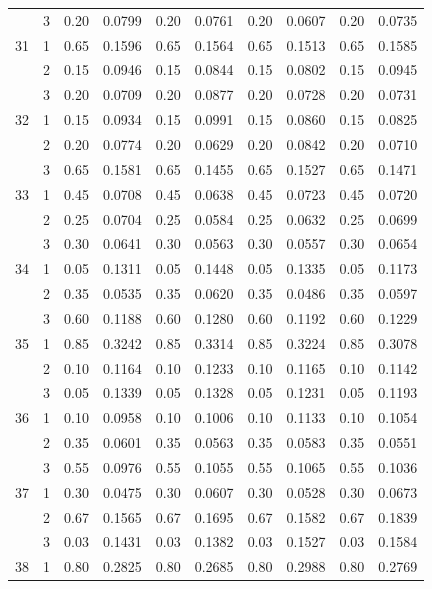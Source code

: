 \begin{longtable}{llcccccccc}
   & 3 & 0.20 & 0.0799 & 0.20 & 0.0761 & 0.20 & 0.0607 & 0.20 & 0.0735 \\ 
  31 & 1 & 0.65 & 0.1596 & 0.65 & 0.1564 & 0.65 & 0.1513 & 0.65 & 0.1585 \\ 
   & 2 & 0.15 & 0.0946 & 0.15 & 0.0844 & 0.15 & 0.0802 & 0.15 & 0.0945 \\ 
   & 3 & 0.20 & 0.0709 & 0.20 & 0.0877 & 0.20 & 0.0728 & 0.20 & 0.0731 \\ 
  32 & 1 & 0.15 & 0.0934 & 0.15 & 0.0991 & 0.15 & 0.0860 & 0.15 & 0.0825 \\ 
   & 2 & 0.20 & 0.0774 & 0.20 & 0.0629 & 0.20 & 0.0842 & 0.20 & 0.0710 \\ 
   & 3 & 0.65 & 0.1581 & 0.65 & 0.1455 & 0.65 & 0.1527 & 0.65 & 0.1471 \\ 
  33 & 1 & 0.45 & 0.0708 & 0.45 & 0.0638 & 0.45 & 0.0723 & 0.45 & 0.0720 \\ 
   & 2 & 0.25 & 0.0704 & 0.25 & 0.0584 & 0.25 & 0.0632 & 0.25 & 0.0699 \\ 
   & 3 & 0.30 & 0.0641 & 0.30 & 0.0563 & 0.30 & 0.0557 & 0.30 & 0.0654 \\ 
  34 & 1 & 0.05 & 0.1311 & 0.05 & 0.1448 & 0.05 & 0.1335 & 0.05 & 0.1173 \\ 
   & 2 & 0.35 & 0.0535 & 0.35 & 0.0620 & 0.35 & 0.0486 & 0.35 & 0.0597 \\ 
   & 3 & 0.60 & 0.1188 & 0.60 & 0.1280 & 0.60 & 0.1192 & 0.60 & 0.1229 \\ 
  35 & 1 & 0.85 & 0.3242 & 0.85 & 0.3314 & 0.85 & 0.3224 & 0.85 & 0.3078 \\ 
   & 2 & 0.10 & 0.1164 & 0.10 & 0.1233 & 0.10 & 0.1165 & 0.10 & 0.1142 \\ 
   & 3 & 0.05 & 0.1339 & 0.05 & 0.1328 & 0.05 & 0.1231 & 0.05 & 0.1193 \\ 
  36 & 1 & 0.10 & 0.0958 & 0.10 & 0.1006 & 0.10 & 0.1133 & 0.10 & 0.1054 \\ 
   & 2 & 0.35 & 0.0601 & 0.35 & 0.0563 & 0.35 & 0.0583 & 0.35 & 0.0551 \\ 
   & 3 & 0.55 & 0.0976 & 0.55 & 0.1055 & 0.55 & 0.1065 & 0.55 & 0.1036 \\ 
  37 & 1 & 0.30 & 0.0475 & 0.30 & 0.0607 & 0.30 & 0.0528 & 0.30 & 0.0673 \\ 
   & 2 & 0.67 & 0.1565 & 0.67 & 0.1695 & 0.67 & 0.1582 & 0.67 & 0.1839 \\ 
   & 3 & 0.03 & 0.1431 & 0.03 & 0.1382 & 0.03 & 0.1527 & 0.03 & 0.1584 \\ 
  38 & 1 & 0.80 & 0.2825 & 0.80 & 0.2685 & 0.80 & 0.2988 & 0.80 & 0.2769 \\ 

\end{longtable}
